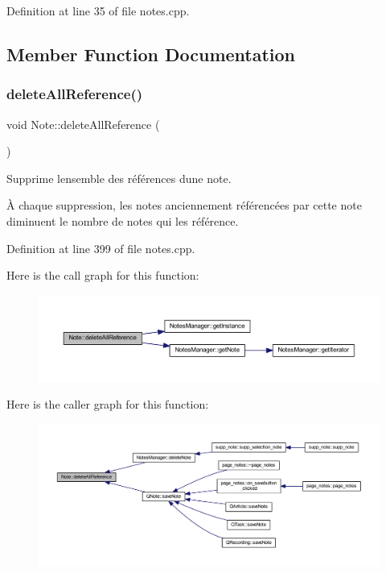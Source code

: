 Definition at line 35 of file notes.\+cpp.



\subsection{Member Function Documentation}
\mbox{\label{class_note_aacbb89b120107a4b25dd16043908c693}} 
\subsubsection{\texorpdfstring{delete\+All\+Reference()}{deleteAllReference()}}
{\footnotesize\ttfamily void Note\+::delete\+All\+Reference (\begin{DoxyParamCaption}{ }\end{DoxyParamCaption})}



Supprime l\textquotesingle{}ensemble des références d\textquotesingle{}une note. 

À chaque suppression, les notes anciennement référencées par cette note diminuent le nombre de notes qui les référence. 

Definition at line 399 of file notes.\+cpp.

Here is the call graph for this function\+:\nopagebreak
\begin{figure}[H]
\begin{center}
\leavevmode
\includegraphics[width=350pt]{class_note_aacbb89b120107a4b25dd16043908c693_cgraph}
\end{center}
\end{figure}
Here is the caller graph for this function\+:\nopagebreak
\begin{figure}[H]
\begin{center}
\leavevmode
\includegraphics[width=350pt]{class_note_aacbb89b120107a4b25dd16043908c693_icgraph}
\end{center}
\end{figure}
\mbox{\label{class_note_a91c86cf6ed18e4badb59a41e737a15fa}} 

